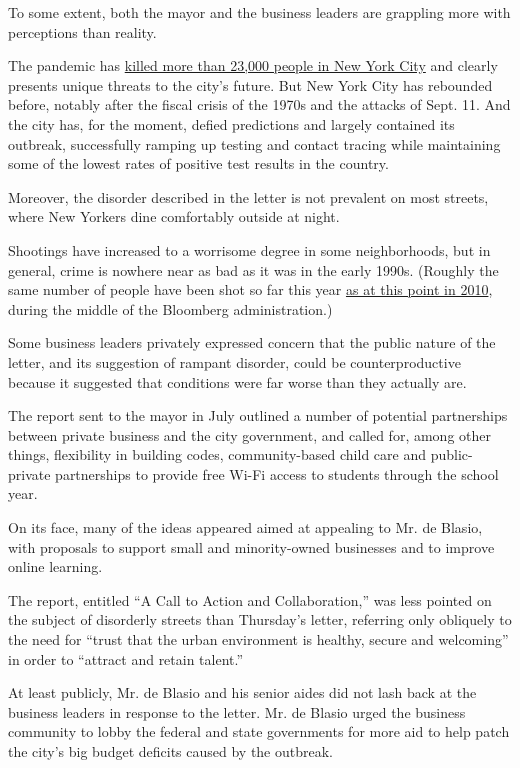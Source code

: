 To some extent, both the mayor and the business leaders are grappling
more with perceptions than reality.

The pandemic has
\href{https://www.nytimes3xbfgragh.onion/interactive/2020/nyregion/new-york-city-coronavirus-cases.html}{killed
more than 23,000 people in New York City} and clearly presents unique
threats to the city's future. But New York City has rebounded before,
notably after the fiscal crisis of the 1970s and the attacks of Sept.
11. And the city has, for the moment, defied predictions and largely
contained its outbreak, successfully ramping up testing and contact
tracing while maintaining some of the lowest rates of positive test
results in the country.

Moreover, the disorder described in the letter is not prevalent on most
streets, where New Yorkers dine comfortably outside at night.

Shootings have increased to a worrisome degree in some neighborhoods,
but in general, crime is nowhere near as bad as it was in the early
1990s. (Roughly the same number of people have been shot so far this
year
\href{https://www1.nyc.gov/assets/nypd/downloads/pdf/crime_statistics/cs-en-us-city.pdf}{as
at this point in 2010}, during the middle of the Bloomberg
administration.)

Some business leaders privately expressed concern that the public nature
of the letter, and its suggestion of rampant disorder, could be
counterproductive because it suggested that conditions were far worse
than they actually are.

The report sent to the mayor in July outlined a number of potential
partnerships between private business and the city government, and
called for, among other things, flexibility in building codes,
community-based child care and public-private partnerships to provide
free Wi-Fi access to students through the school year.

On its face, many of the ideas appeared aimed at appealing to Mr. de
Blasio, with proposals to support small and minority-owned businesses
and to improve online learning.

The report, entitled ``A Call to Action and Collaboration,'' was less
pointed on the subject of disorderly streets than Thursday's letter,
referring only obliquely to the need for ``trust that the urban
environment is healthy, secure and welcoming'' in order to ``attract and
retain talent.''

At least publicly, Mr. de Blasio and his senior aides did not lash back
at the business leaders in response to the letter. Mr. de Blasio urged
the business community to lobby the federal and state governments for
more aid to help patch the city's big budget deficits caused by the
outbreak.

